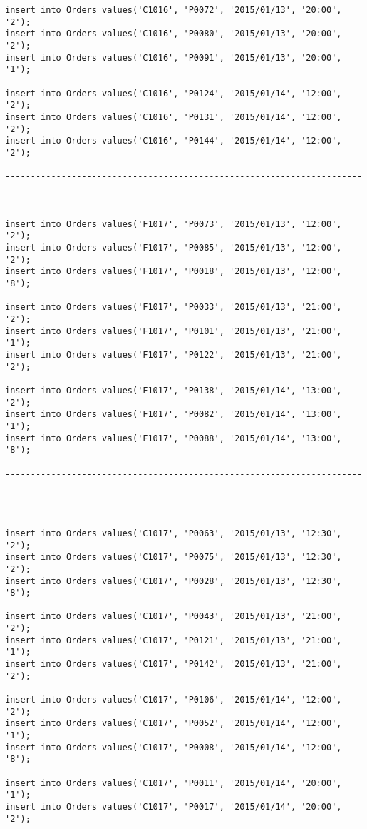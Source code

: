 \documentclass[a4,12pt]{report}
\begin{document}
\begin{lstlisting}
insert into Orders values('C1016', 'P0072', '2015/01/13', '20:00', '2');
insert into Orders values('C1016', 'P0080', '2015/01/13', '20:00', '2');
insert into Orders values('C1016', 'P0091', '2015/01/13', '20:00', '1');

insert into Orders values('C1016', 'P0124', '2015/01/14', '12:00', '2');
insert into Orders values('C1016', 'P0131', '2015/01/14', '12:00', '2');
insert into Orders values('C1016', 'P0144', '2015/01/14', '12:00', '2');

----------------------------------------------------------------------------------------------------------------------------------------------------------------------

insert into Orders values('F1017', 'P0073', '2015/01/13', '12:00', '2');
insert into Orders values('F1017', 'P0085', '2015/01/13', '12:00', '2');
insert into Orders values('F1017', 'P0018', '2015/01/13', '12:00', '8');

insert into Orders values('F1017', 'P0033', '2015/01/13', '21:00', '2');
insert into Orders values('F1017', 'P0101', '2015/01/13', '21:00', '1');
insert into Orders values('F1017', 'P0122', '2015/01/13', '21:00', '2');

insert into Orders values('F1017', 'P0138', '2015/01/14', '13:00', '2');
insert into Orders values('F1017', 'P0082', '2015/01/14', '13:00', '1');
insert into Orders values('F1017', 'P0088', '2015/01/14', '13:00', '8');

----------------------------------------------------------------------------------------------------------------------------------------------------------------------


insert into Orders values('C1017', 'P0063', '2015/01/13', '12:30', '2');
insert into Orders values('C1017', 'P0075', '2015/01/13', '12:30', '2');
insert into Orders values('C1017', 'P0028', '2015/01/13', '12:30', '8');

insert into Orders values('C1017', 'P0043', '2015/01/13', '21:00', '2');
insert into Orders values('C1017', 'P0121', '2015/01/13', '21:00', '1');
insert into Orders values('C1017', 'P0142', '2015/01/13', '21:00', '2');

insert into Orders values('C1017', 'P0106', '2015/01/14', '12:00', '2');
insert into Orders values('C1017', 'P0052', '2015/01/14', '12:00', '1');
insert into Orders values('C1017', 'P0008', '2015/01/14', '12:00', '8');

insert into Orders values('C1017', 'P0011', '2015/01/14', '20:00', '1');
insert into Orders values('C1017', 'P0017', '2015/01/14', '20:00', '2');


\end{lstlisting}
\end{document}
